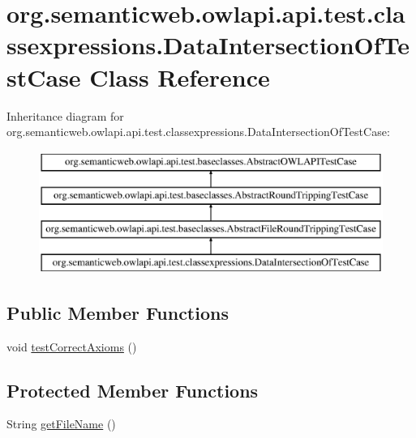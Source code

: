 \hypertarget{classorg_1_1semanticweb_1_1owlapi_1_1api_1_1test_1_1classexpressions_1_1_data_intersection_of_test_case}{\section{org.\-semanticweb.\-owlapi.\-api.\-test.\-classexpressions.\-Data\-Intersection\-Of\-Test\-Case Class Reference}
\label{classorg_1_1semanticweb_1_1owlapi_1_1api_1_1test_1_1classexpressions_1_1_data_intersection_of_test_case}
}
Inheritance diagram for org.\-semanticweb.\-owlapi.\-api.\-test.\-classexpressions.\-Data\-Intersection\-Of\-Test\-Case\-:\begin{figure}[H]
\begin{center}
\leavevmode
\includegraphics[height=4.000000cm]{classorg_1_1semanticweb_1_1owlapi_1_1api_1_1test_1_1classexpressions_1_1_data_intersection_of_test_case}
\end{center}
\end{figure}
\subsection*{Public Member Functions}
\begin{DoxyCompactItemize}
\item 
void \hyperlink{classorg_1_1semanticweb_1_1owlapi_1_1api_1_1test_1_1classexpressions_1_1_data_intersection_of_test_case_a40563d5e99bf2a6cee801a935de48353}{test\-Correct\-Axioms} ()
\end{DoxyCompactItemize}
\subsection*{Protected Member Functions}
\begin{DoxyCompactItemize}
\item 
String \hyperlink{classorg_1_1semanticweb_1_1owlapi_1_1api_1_1test_1_1classexpressions_1_1_data_intersection_of_test_case_a306ba770deef60cd8dd6da40cf30f2e7}{get\-File\-Name} ()
\end{DoxyCompactItemize}


